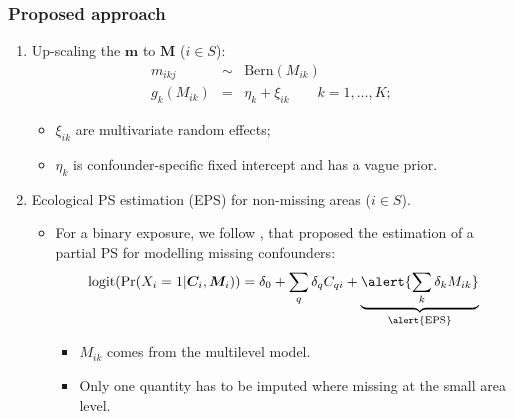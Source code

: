 \documentclass[slidestop,compress,serif,10pt]{beamer}
\begin{document}
\begin{frame}
\frametitle{Proposed approach}
\begin{enumerate} [{(1)}]
  \item \vfill Up-scaling the $\boldsymbol{m}$ to $\boldsymbol{M}$ ($i\in S$):
\begin{eqnarray*}
  m_{ikj} &\sim& \mbox{Bern}(M_{ik})\\
  g_{k}(M_{ik})&=& \eta_{k}+\xi_{ik} \qquad k=1,\ldots,K;
\end{eqnarray*}
\begin{itemize}
  \item \vfill $\xi_{ik}$ are multivariate random effects;\\
  \item \vfill $\eta_{k}$ is confounder-specific fixed intercept and has a vague prior.
\end{itemize}
\pause  \item \vfill Ecological PS estimation (EPS) for non-missing areas ($i\in S$).
\begin{itemize}
\item \vfill For a binary exposure, we follow \citet{Mccandless2012}, that proposed the estimation of a partial PS for modelling missing confounders:
\begin{equation*}
\text{logit}(\text{Pr}(X_{i}=1 | \boldsymbol{C}_{i}, \boldsymbol{M}_{i} )) = \delta_{0} + \sum_{q} \delta_{q} C_{qi} + \underbrace{\alert{\sum_{k} \delta_{k}M_{ik}}}_{\alert{\text{EPS}}}
\end{equation*}

\begin{itemize}
\item $M_{ik}$ comes from the multilevel model.
\item Only one quantity has to be imputed where missing at the small area level.
\end{itemize}
\end{itemize}
\end{enumerate}
\end{frame}
\end{document}

